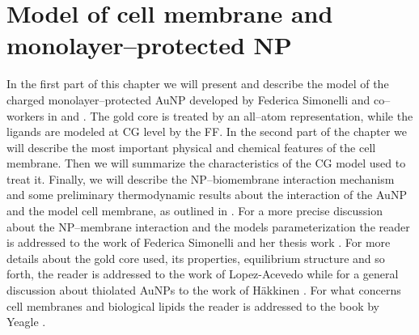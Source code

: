 \chapter{Model of cell membrane and monolayer--protected NP}
\label{chap:membraneNP}
In the first part of this chapter we will present and describe the model of the charged monolayer--protected 
\ac{AuNP} developed by Federica Simonelli and co--workers in \cite{simonelliThesis} and \cite{ourPaper}. The 
gold core is treated by an all--atom representation, while the ligands are modeled at \ac{CG} level by the 
\martini \ac{FF}. In the second part of the chapter we will describe the most important physical and chemical 
features of the cell membrane. Then we will summarize the characteristics of the \ac{CG} model used to treat 
it. Finally, we will describe the \ac{NP}--biomembrane interaction mechanism and some preliminary thermodynamic 
results about the interaction of the \ac{AuNP} and the model cell membrane, as outlined in \cite{ourPaper}. For 
a more precise discussion about the \ac{NP}--membrane interaction and the models parameterization the reader is 
addressed to the work of Federica Simonelli \etal \cite{ourPaper} and her thesis work \cite{simonelliThesis}. 
For more details about the gold core used, its properties, equilibrium structure and so forth, the reader is 
addressed to the work of Lopez-Acevedo \etal \cite{clusterEquilibrium} while for a general discussion about 
thiolated \acp{AuNP} to the work of Häkkinen \cite{corePassivated}. For what concerns cell membranes and 
biological lipids the reader is addressed to the book by Yeagle \cite{yeagle}.

